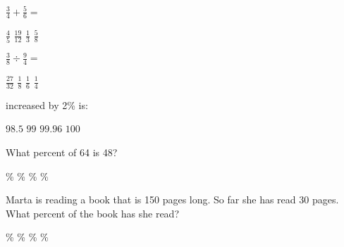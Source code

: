 \documentclass[10pt,answers]{exam}
\begin{document}
\begin{questions}




\question $\displaystyle \frac{3}{4}+\frac{5}{6}=$ 
\begin{oneparchoices}
\choice $\displaystyle \frac{4}{5}$
\CorrectChoice $\displaystyle \frac{19}{12}$
\choice $\displaystyle \frac{1}{3}$
\choice $\displaystyle \frac{5}{8}$
\end{oneparchoices}

\question $\displaystyle \frac{3}{8}\div\frac{9}{4}=$ 
\begin{oneparchoices}
\choice $\displaystyle \frac{27}{32}$
\choice $\displaystyle \frac{1}{8}$
\CorrectChoice $\displaystyle \frac{1}{6}$
\choice $\displaystyle \frac{1}{4}$
\end{oneparchoices}

 increased by 2\% is: 
\begin{oneparchoices}
\choice $\displaystyle 98.5$
\choice $\displaystyle 99$
\CorrectChoice $\displaystyle 99.96$
\choice $\displaystyle 100$
\end{oneparchoices}

\question 
What percent of 64 is 48?
\begin{oneparchoices}
\%
\%
\%
\%
\end{oneparchoices}




\question
Marta is reading a book that is 150 pages long. So far she has read 30 pages. What percent of the book has she read?
\begin{oneparchoices}
\%
\%
\%
\%
\end{oneparchoices}




\end{questions}
\end{document}
